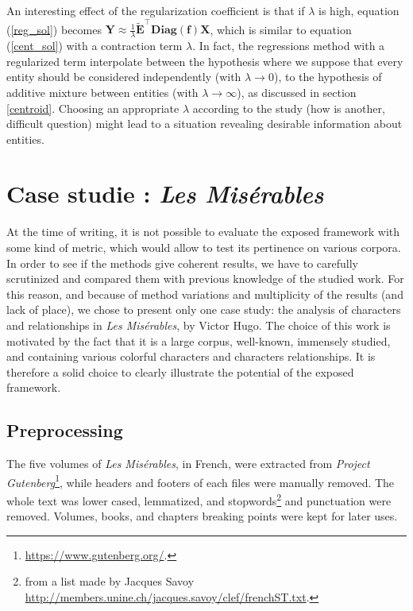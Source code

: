 \documentclass[
twocolumn,
]{ceurart}
\begin{document}
An interesting effect of the regularization coefficient is that if $\lambda$ is high, equation (\ref{reg_sol}) becomes $\mathbf{Y} \approx \frac{1}{\lambda} \widetilde{\mathbf{E}}^\top \textbf{Diag}(\mathbf{f}) \mathbf{X}$, which is similar to equation (\ref{cent_sol}) with a contraction term $\lambda$. In fact, the regressions method with a regularized term interpolate between the hypothesis where we suppose that every entity should be considered independently (with $\lambda \to 0$), to the hypothesis of additive mixture between entities (with $\lambda \to \infty$), as discussed in section \ref{centroid}. Choosing an appropriate $\lambda$ according to the study (how is another, difficult question) might lead to a situation revealing desirable information about entities.

\section{Case studie : \emph{Les Misérables}}
\label{case_studie}

At the time of writing, it is not possible to evaluate the exposed framework with some kind of metric, which would allow to test its pertinence on various corpora. In order to see if the methods give coherent results, we have to carefully scrutinized and compared them with previous knowledge of the studied work. For this reason, and because of method variations and multiplicity of the results (and lack of place), we chose to present only one case study: the analysis of characters and relationships in \emph{Les Misérables}, by Victor Hugo. The choice of this work is motivated by the fact that it is a large corpus, well-known, immensely studied, and containing various colorful characters and characters relationships. It is therefore a solid choice to clearly illustrate the potential of the exposed framework.

\subsection{Preprocessing}

The five volumes of \emph{Les Misérables}, in French, were extracted from \emph{Project Gutenberg}\footnote{\url{https://www.gutenberg.org/}.}, while headers and footers of each files were manually removed. The whole text was lower cased, lemmatized, and stopwords\footnote{from a list made by Jacques Savoy \url{http://members.unine.ch/jacques.savoy/clef/frenchST.txt}.} and punctuation were removed. Volumes, books, and chapters breaking points were kept for later uses. 
\end{document}
